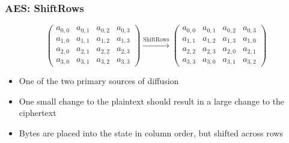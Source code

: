 \documentclass[12pt]{beamer}
\begin{document}
\begin{frame}
\frametitle{AES: ShiftRows}

\[ \left( \begin{array}{cccc}
a_{0,0} & a_{0,1} & a_{0,2} & a_{0,3} \\[0pt]
a_{1,0} & a_{1,1} & a_{1,2} & a_{1,3} \\[0pt]
a_{2,0} & a_{2,1} & a_{2,2} & a_{2,3} \\[0pt]
a_{3,0} & a_{3,1} & a_{3,2} & a_{3,3}\end{array} \right)
\xrightarrow{\text{ShiftRows}}
\left( \begin{array}{cccc}
a_{0,0} & a_{0,1} & a_{0,2} & a_{0,3} \\[0pt]
a_{1,1} & a_{1,2} & a_{1,3} & a_{1,0} \\[0pt]
a_{2,2} & a_{2,3} & a_{2,0} & a_{2,1} \\[0pt]
a_{3,3} & a_{3,0} & a_{3,1} & a_{3,2}\end{array} \right)
\]

\pause

\begin{itemize}
\item One of the two primary sources of diffusion \pause
\item One small change to the plaintext should result in a large change to the ciphertext \pause
\item Bytes are placed into the state in column order, but shifted across rows
\end{itemize}
\end{frame}
\end{document}
